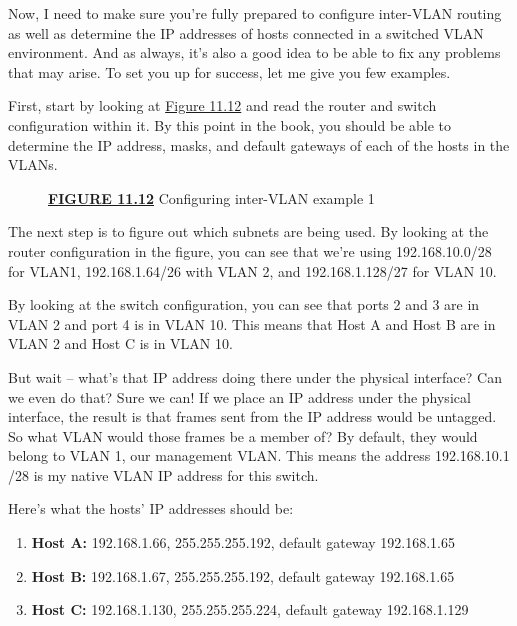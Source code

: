 Now, I need to make sure you're fully prepared to configure inter-VLAN
routing as well as determine the IP addresses of hosts connected in a
switched VLAN environment. And as always, it's also a good idea to be
able to fix any problems that may arise. To set you up for success, let
me give you few examples.

First, start by looking at
\protect\hyperlink{c11.xhtmlux5cux23figure11-12}{Figure 11.12} and read
the router and switch configuration within it. By this point in the
book, you should be able to determine the IP address, masks, and default
gateways of each of the hosts in the VLANs.



\begin{figure}
\centering
\caption{{\protect\hyperlink{c11.xhtmlux5cux23figureanchor11-12}{\textbf{FIGURE
11.12}} Configuring inter-VLAN example 1}}
\end{figure}

The next step is to figure out which subnets are being used. By looking
at the router configuration in the figure, you can see that we're using
192.168.10.0/28 for VLAN1, 192.168.1.64/26 with VLAN 2, and
192.168.1.128/27 for VLAN 10.

By looking at the switch configuration, you can see that ports 2 and 3
are in VLAN 2 and port 4 is in VLAN 10. This means that Host A and Host
B are in VLAN 2 and Host C is in VLAN 10.

But wait -- what's that IP address doing there under the physical
interface? Can we even do that? Sure we can! If we place an IP address
under the physical interface, the result is that frames sent from the IP
address would be untagged. So what VLAN would those frames be a member
of? By default, they would belong to VLAN 1, our management VLAN. This
means the address 192.168.10.1 /28 is my native VLAN IP address for this
switch.

Here's what the hosts' IP addresses should be:

\begin{enumerate}
\item
  \textbf{Host A:} 192.168.1.66, 255.255.255.192, default gateway
  192.168.1.65
\item
  \textbf{Host B:} 192.168.1.67, 255.255.255.192, default gateway
  192.168.1.65
\item
  \textbf{Host C:} 192.168.1.130, 255.255.255.224, default gateway
  192.168.1.129
\end{enumerate}

